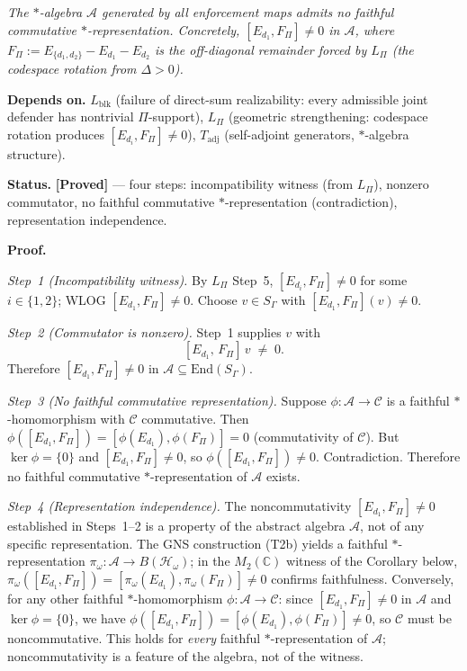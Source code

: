 \documentclass[11pt]{article}
\theoremstyle{remark}
\begin{document}
\begin{tcolorbox}[apfbox, title={Theorem $T_{\mathrm{alg}}$ (Enforcement Algebra is Non-Commutative)}]
\label{thm:T_alg}
\textit{The $*$-algebra $\mathcal{A}$ generated by all enforcement maps admits no faithful commutative $*$-representation.  Concretely, $[E_{d_1}, F_\Pi] \ne 0$ in $\mathcal{A}$, where $F_\Pi := E_{\{d_1,d_2\}} - E_{d_1} - E_{d_2}$ is the off-diagonal remainder forced by $L_\Pi$ (the codespace rotation from $\Delta > 0$).}

\smallskip\noindent\textbf{Depends on.}  $L_{\mathrm{blk}}$ (failure of direct-sum realizability: every admissible joint defender has nontrivial $\Pi$-support), $L_\Pi$ (geometric strengthening: codespace rotation produces $[E_{d_i}, F_\Pi] \ne 0$), $T_{\mathrm{adj}}$ (self-adjoint generators, $*$-algebra structure).

\smallskip\noindent\textbf{Status.}  \textbf{[Proved]} --- four steps: incompatibility witness (from $L_\Pi$), nonzero commutator, no faithful commutative $*$-representation (contradiction), representation independence.

\smallskip\noindent\textbf{Proof.}

\textit{Step~1 (Incompatibility witness).}
By $L_\Pi$ Step~5, $[E_{d_i}, F_\Pi] \ne 0$ for some $i \in \{1,2\}$; WLOG $[E_{d_1}, F_\Pi] \ne 0$.  Choose $v \in S_\Gamma$ with $[E_{d_1}, F_\Pi](v) \ne 0$.

\textit{Step~2 (Commutator is nonzero).}  Step~1 supplies $v$ with
\[
[E_{d_1},\, F_\Pi]\,v \;\ne\; 0.
\]
Therefore $[E_{d_1}, F_\Pi] \ne 0$ in $\mathcal{A} \subseteq \mathrm{End}(S_\Gamma)$.

\textit{Step~3 (No faithful commutative representation).}
Suppose $\phi: \mathcal{A} \to \mathcal{C}$ is a faithful $*$-homomorphism with $\mathcal{C}$ commutative.  Then $\phi([E_{d_1}, F_\Pi]) = [\phi(E_{d_1}), \phi(F_\Pi)] = 0$ (commutativity of $\mathcal{C}$).  But $\ker\phi = \{0\}$ and $[E_{d_1}, F_\Pi] \ne 0$, so $\phi([E_{d_1},F_\Pi]) \ne 0$.  Contradiction.  Therefore no faithful commutative $*$-representation of $\mathcal{A}$ exists.

\textit{Step~4 (Representation independence).}  The noncommutativity $[E_{d_1}, F_\Pi] \ne 0$ established in Steps~1--2 is a property of the abstract algebra $\mathcal{A}$, not of any specific representation.  The GNS construction (T2b) yields a faithful $*$-representation $\pi_\omega: \mathcal{A} \to B(\mathcal{H}_\omega)$; in the $M_2(\mathbb{C})$ witness of the Corollary below, $\pi_\omega([E_{d_1}, F_\Pi]) = [\pi_\omega(E_{d_1}), \pi_\omega(F_\Pi)] \ne 0$ confirms faithfulness.  Conversely, for any other faithful $*$-homomorphism $\phi: \mathcal{A} \to \mathcal{C}$: since $[E_{d_1}, F_\Pi] \ne 0$ in $\mathcal{A}$ and $\ker\phi = \{0\}$, we have $\phi([E_{d_1}, F_\Pi]) = [\phi(E_{d_1}), \phi(F_\Pi)] \ne 0$, so $\mathcal{C}$ must be noncommutative.  This holds for \emph{every} faithful $*$-representation of $\mathcal{A}$; noncommutativity is a feature of the algebra, not of the witness.


\end{tcolorbox}
\end{document}
